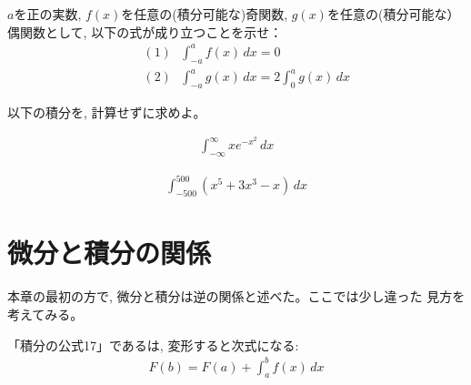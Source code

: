 \begin{q}\label{q:int_odd0} $a$を正の実数, $f(x)$を任意の(積分可能な)奇関数, 
$g(x)$を任意の(積分可能な）偶関数として, 以下の式が成り立つことを示せ：
\begin{eqnarray}
&&(1)\,\,\,\,\int_{-a}^{a}f(x)\, dx=0\\
&&(2)\,\,\,\,\int_{-a}^{a}g(x)\,dx=2\int_{0}^{a}g(x)\, dx
\end{eqnarray}
\end{q}
\mv

\begin{q}\label{q:int_odd2} 以下の積分を, 計算せずに求めよ。
\begin{edaenumerate}
\item \begin{eqnarray*}\int_{-\infty}^{\infty}xe^{-x^2}\, dx\end{eqnarray*}
\item \begin{eqnarray*}\int_{-500}^{500}(x^5+3x^3-x)\, dx\end{eqnarray*}
\end{edaenumerate}\end{q}
\hv



\section{微分と積分の関係}

本章の最初の方で, 微分と積分は逆の関係と述べた。ここでは少し違った
見方を考えてみる。

「積分の公式17」であるは, 変形すると次式になる:
\begin{eqnarray}
F(b)=F(a)+\int_{a}^{b}f(x)\,dx\label{eq:Fb_Fa_int_f}
\end{eqnarray}

